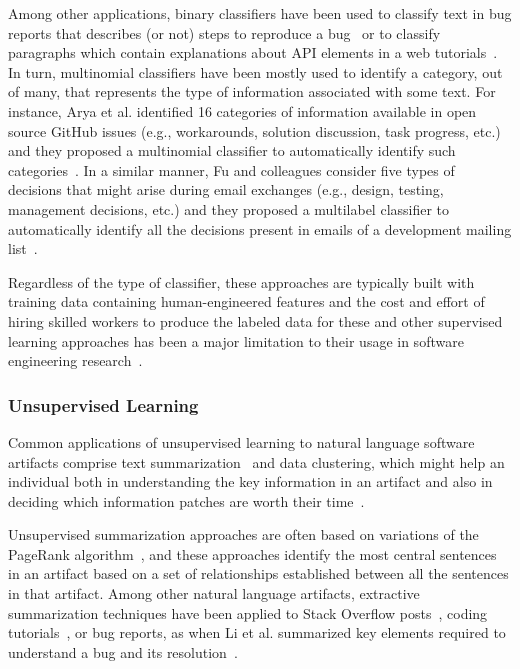 Among other applications, binary classifiers have been used 
to classify text in bug reports that describes (or not) steps to reproduce a bug~\cite{Chaparro2016}
or  to classify paragraphs which contain explanations 
about API elements in a web tutorials~\cite{Petrosyan2015}.
In turn, multinomial classifiers have been mostly used 
to identify a category, out of many, that represents the type of information 
associated with some text. For instance, Arya et al. identified 16 categories of  information available
in open source GitHub issues (e.g., workarounds, solution discussion, task progress, etc.)
and they proposed a multinomial classifier 
to automatically identify such categories~\cite{Arya2019}.
In a similar manner, Fu and colleagues consider 
five types of decisions that might arise during 
email exchanges (e.g., design, testing, management decisions, etc.)
and they proposed a multilabel classifier 
to automatically identify all the decisions present in emails of
a development mailing list~\cite{fu2021}.





Regardless of the type of classifier, these approaches are typically built 
with training data containing human-engineered features and the cost and effort of hiring skilled workers to produce 
the labeled data for these and other supervised learning approaches
has been a major limitation to their usage in software engineering research~\cite{Arpteg2018, ferreira2021}.




\subsubsection{Unsupervised Learning}
\label{cp2:unsupervised}



Common applications of unsupervised learning 
to natural language software artifacts 
comprise text summarization~\cite{Goldsteinet1999} and data clustering, which might help an individual both in understanding the key information in an 
artifact and also in deciding which information patches are 
 worth their time~\cite{Lotufo2012}.


Unsupervised summarization approaches are often based on 
variations of the PageRank algorithm~\cite{Page1999}, and these approaches identify
the most central sentences in an artifact based on a set of relationships
established between all the sentences in that artifact.
Among other natural language artifacts,
extractive summarization techniques
have been applied to Stack Overflow posts~\cite{Ponzanelli2015},
coding tutorials~\cite{Li2018},
or bug reports, as
when Li et al. summarized 
key elements required to understand a bug and its resolution~\cite{li2018deep}.




